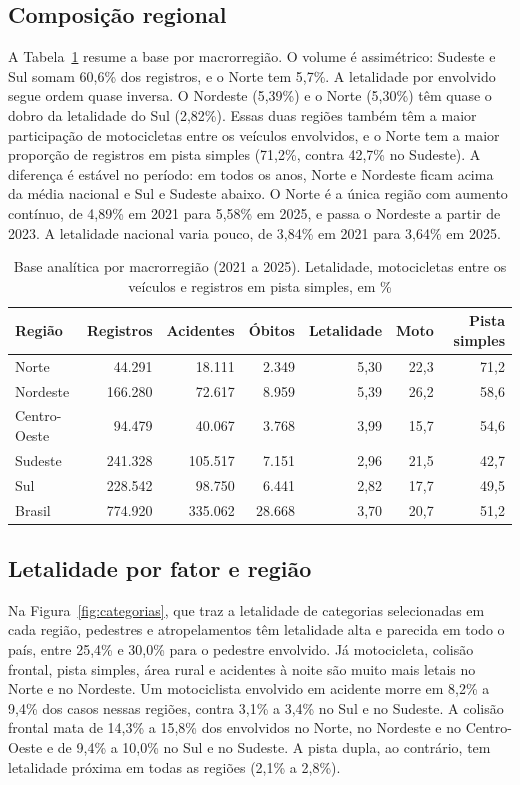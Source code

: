 \documentclass[12pt]{article}
\begin{document}
\subsection{Composição regional}

A Tabela~\ref{tab:regioes} resume a base por macrorregião. O volume é
assimétrico: Sudeste e Sul somam 60,6\% dos registros, e o Norte tem
5,7\%. A letalidade por envolvido segue ordem quase inversa. O Nordeste
(5,39\%) e o Norte (5,30\%) têm quase o dobro da letalidade do Sul
(2,82\%). Essas duas regiões também têm a maior participação de
motocicletas entre os veículos envolvidos, e o Norte tem a maior
proporção de registros em pista simples (71,2\%, contra 42,7\% no
Sudeste). A diferença é estável no período: em todos os anos, Norte e
Nordeste ficam acima da média nacional e Sul e Sudeste abaixo. O Norte é
a única região com aumento contínuo, de 4,89\% em 2021 para 5,58\% em
2025, e passa o Nordeste a partir de 2023. A letalidade nacional varia
pouco, de 3,84\% em 2021 para 3,64\% em 2025.

\begin{table}[H]
\centering
\caption{Base analítica por macrorregião (2021 a 2025). Letalidade,
motocicletas entre os veículos e registros em pista simples, em \%}
\label{tab:regioes}
\small
\setlength{\tabcolsep}{4pt}
\begin{tabular}{lrrrrrr}
\toprule
Região & Registros & Acidentes & Óbitos & Letalidade & Moto & Pista simples \\
\midrule
Norte        &  44.291 &  18.111 &  2.349 & 5,30 & 22,3 & 71,2 \\
Nordeste     & 166.280 &  72.617 &  8.959 & 5,39 & 26,2 & 58,6 \\
Centro-Oeste &  94.479 &  40.067 &  3.768 & 3,99 & 15,7 & 54,6 \\
Sudeste      & 241.328 & 105.517 &  7.151 & 2,96 & 21,5 & 42,7 \\
Sul          & 228.542 &  98.750 &  6.441 & 2,82 & 17,7 & 49,5 \\
\midrule
Brasil       & 774.920 & 335.062 & 28.668 & 3,70 & 20,7 & 51,2 \\
\bottomrule
\end{tabular}
\end{table}

\subsection{Letalidade por fator e região}

Na Figura~\ref{fig:categorias}, que traz a letalidade de categorias
selecionadas em cada região, pedestres e atropelamentos têm letalidade
alta e parecida em todo o país, entre
25,4\% e 30,0\% para o pedestre envolvido. Já motocicleta, colisão
frontal, pista simples, área rural e acidentes à noite são muito mais
letais no Norte e no Nordeste. Um motociclista envolvido em acidente
morre em 8,2\% a 9,4\% dos casos nessas regiões, contra 3,1\% a 3,4\% no
Sul e no Sudeste. A colisão frontal mata de 14,3\% a 15,8\% dos
envolvidos no Norte, no Nordeste e no Centro-Oeste e de 9,4\% a
10,0\% no Sul e no Sudeste. A pista dupla, ao contrário, tem letalidade
próxima em todas as regiões (2,1\% a 2,8\%).
\end{document}

